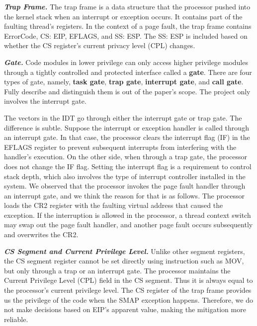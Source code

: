 \textbf{\textit{Trap Frame.}}  The trap frame is a data structure that the processor pushed into the kernel stack when an interrupt or exception occurs. It contains part of the faulting thread's registers. In the context of a page fault, the trap frame contains ErrorCode, CS: EIP, EFLAGS, and SS: ESP. The SS: ESP is included based on whether the CS register's current privacy level (CPL) changes.



\textbf{\textit{Gate.}} Code modules in lower privilege can only access higher privilege modules through a tightly controlled and protected interface called a \textbf{gate}.  There are four types of gate, namely, \textbf{task gate}, \textbf{trap gate}, \textbf{interrupt gate}, and \textbf{call gate}. Fully describe and distinguish them is out of the paper's scope. The project only involves the interrupt gate.

The vectors in the IDT go through either the interrupt gate or trap gate. The difference is subtle. Suppose the interrupt or exception handler is called through an interrupt gate. In that case, the processor clears the interrupt flag (IF) in the EFLAGS register to prevent subsequent interrupts from interfering with the handler's execution.  On the other side, when through a trap gate, the processor does not change the IF flag. Setting the interrupt flag is a requirement to control stack depth, which also involves the type of interrupt controller installed in the system. We observed that the processor invokes the page fault handler through an interrupt gate, and we think the reason for that is as follows. The processor loads the CR2 register with the faulting virtual address that caused the exception. If the interruption is allowed in the processor, a thread context switch may swap out the page fault handler, and another page fault occurs subsequently and overwrites the CR2.



\textbf{\textit{CS Segment and Current Privilege Level.}} Unlike other segment registers, the CS segment register cannot be set directly using instruction such as MOV,  but only through a trap or an interrupt gate.  The processor maintains the Current Privilege Level (CPL) field in the CS segment. Thus it is always equal to the processor's current privilege level. The CS register of the trap frame provides us the privilege of the code when the SMAP exception happens. Therefore, we do not make decisions based on EIP's apparent value, making the mitigation more reliable.


